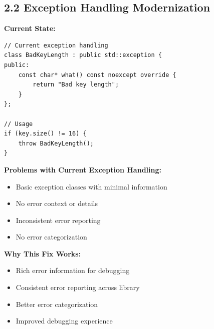 \documentclass[11pt,a4paper]{article}
\begin{document}
\subsection{2.2 Exception Handling Modernization}

\textbf{Current State:}
\begin{lstlisting}
// Current exception handling
class BadKeyLength : public std::exception {
public:
    const char* what() const noexcept override {
        return "Bad key length";
    }
};

// Usage
if (key.size() != 16) {
    throw BadKeyLength();
}
\end{lstlisting}

\textcolor{problemred}{\textbf{Problems with Current Exception Handling:}}
\begin{itemize}
    \item Basic exception classes with minimal information
    \item No error context or details
    \item Inconsistent error reporting
    \item No error categorization
\end{itemize}

\textcolor{solutiongreen}{\textbf{Why This Fix Works:}}
\begin{itemize}
    \item Rich error information for debugging
    \item Consistent error reporting across library
    \item Better error categorization
    \item Improved debugging experience
\end{itemize}
\end{document}
